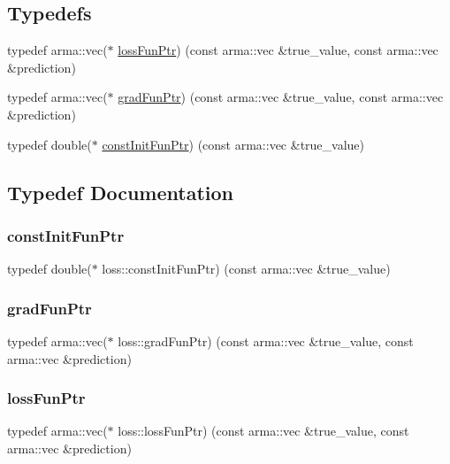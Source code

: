 \subsection*{Typedefs}
\begin{DoxyCompactItemize}
\item 
typedef arma\+::vec($\ast$ \mbox{\hyperlink{namespaceloss_a6658cb84c8687d6dd0904c00801542f3}{loss\+Fun\+Ptr}}) (const arma\+::vec \&true\+\_\+value, const arma\+::vec \&prediction)
\item 
typedef arma\+::vec($\ast$ \mbox{\hyperlink{namespaceloss_acae0785d794ff7cc1b1242bab23f81c6}{grad\+Fun\+Ptr}}) (const arma\+::vec \&true\+\_\+value, const arma\+::vec \&prediction)
\item 
typedef double($\ast$ \mbox{\hyperlink{namespaceloss_af21a5d5ed7431ecbc73730ce2bde3987}{const\+Init\+Fun\+Ptr}}) (const arma\+::vec \&true\+\_\+value)
\end{DoxyCompactItemize}


\subsection{Typedef Documentation}
\mbox{\label{namespaceloss_af21a5d5ed7431ecbc73730ce2bde3987}} 
\subsubsection{\texorpdfstring{const\+Init\+Fun\+Ptr}{constInitFunPtr}}
{\footnotesize\ttfamily typedef double($\ast$ loss\+::const\+Init\+Fun\+Ptr) (const arma\+::vec \&true\+\_\+value)}

\mbox{\label{namespaceloss_acae0785d794ff7cc1b1242bab23f81c6}} 
\subsubsection{\texorpdfstring{grad\+Fun\+Ptr}{gradFunPtr}}
{\footnotesize\ttfamily typedef arma\+::vec($\ast$ loss\+::grad\+Fun\+Ptr) (const arma\+::vec \&true\+\_\+value, const arma\+::vec \&prediction)}

\mbox{\label{namespaceloss_a6658cb84c8687d6dd0904c00801542f3}} 
\subsubsection{\texorpdfstring{loss\+Fun\+Ptr}{lossFunPtr}}
{\footnotesize\ttfamily typedef arma\+::vec($\ast$ loss\+::loss\+Fun\+Ptr) (const arma\+::vec \&true\+\_\+value, const arma\+::vec \&prediction)}

